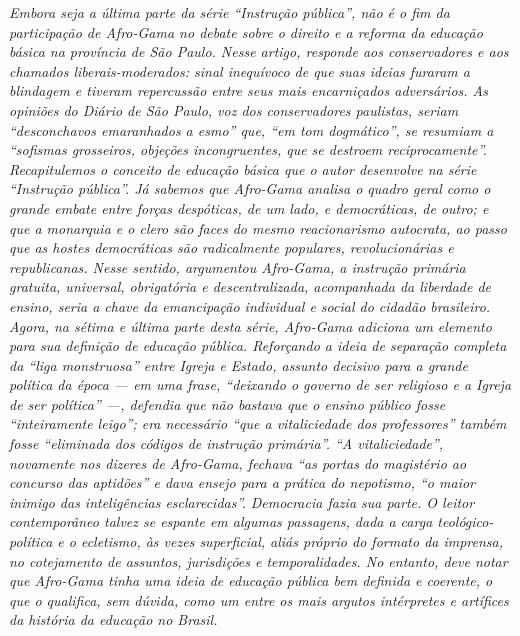 \begin{didascalia}\itshape
Embora seja a última parte da série ``Instrução pública'', não é
o fim da participação de Afro-Gama no debate sobre
o direito e a reforma da educação básica na província de São Paulo.
Nesse artigo, responde aos conservadores e aos
chamados liberais-moderados: sinal inequívoco de que suas ideias
furaram a blindagem e tiveram repercussão entre seus mais encarniçados
adversários. As opiniões do \textnormal{Diário de São Paulo}, voz dos
conservadores paulistas, seriam ``desconchavos emaranhados a esmo'' que,
``em tom dogmático'', se resumiam a ``sofismas grosseiros, objeções
incongruentes, que se destroem reciprocamente''.
Recapitulemos o conceito de educação básica que o autor desenvolve na série
``Instrução pública''. Já sabemos que Afro-Gama analisa o
quadro geral como o grande embate entre forças despóticas, de um lado, e
democráticas, de outro; e que a monarquia e o clero são faces do mesmo
reacionarismo autocrata, ao passo que as hostes democráticas são
radicalmente populares, revolucionárias e republicanas. Nesse sentido,
argumentou Afro-Gama, a instrução primária gratuita, universal,
obrigatória e descentralizada, acompanhada da liberdade de ensino, seria
a chave da emancipação individual e social do cidadão brasileiro. Agora,
na sétima e última parte desta série, Afro-Gama adiciona um
elemento para sua definição de educação pública. Reforçando a ideia de
separação completa da ``liga monstruosa'' entre Igreja e Estado, assunto
decisivo para a grande política da época --- em uma frase,
``deixando o governo de ser religioso e a Igreja de ser política''
---, defendia que não bastava que o ensino público fosse
``inteiramente leigo''; era necessário ``que a vitaliciedade dos
professores'' também fosse ``eliminada dos códigos de instrução primária''.
``A vitaliciedade'', novamente nos dizeres de Afro-Gama, fechava
``as portas do magistério ao concurso das aptidões'' e dava ensejo para a
prática do nepotismo, ``o maior inimigo das inteligências esclarecidas''.
\textnormal{Democracia} fazia sua parte. O leitor contemporâneo talvez se
espante em algumas passagens, dada a carga teológico-política e o
ecletismo, às vezes superficial, aliás próprio do formato da imprensa,
no cotejamento de assuntos, jurisdições e temporalidades. No entanto,
deve notar que Afro-Gama tinha uma ideia de educação pública bem
definida e coerente, o que o qualifica, sem dúvida, como um entre os
mais argutos intérpretes e artífices da história da educação no Brasil.
\end{didascalia}



